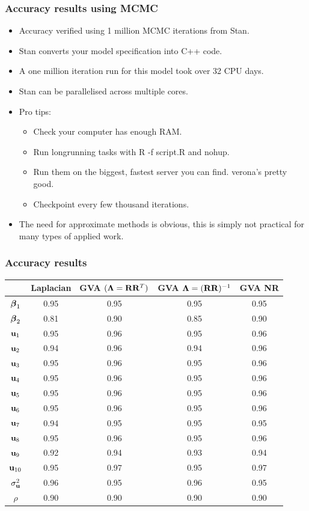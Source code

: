\documentclass{beamer}
\begin{document}
\begin{frame}
\frametitle{Accuracy results using MCMC}
\begin{itemize}
\item Accuracy verified using 1 million MCMC iterations from Stan.
\item Stan converts your model specification into C++ code.
\item A one million iteration run for this model took over 32 CPU days.
\item Stan can be parallelised across multiple cores.
\item Pro tips:
\begin{itemize}
\item Check your computer has enough RAM.
\item Run longrunning tasks with R -f script.R and nohup.
\item Run them on the biggest, fastest server you can find. verona's pretty good.
\item Checkpoint every few thousand iterations.
\end{itemize}
\item The need for approximate methods is obvious, this is simply not
practical for many types of applied work.
\end{itemize}
\end{frame}

\begin{frame}
\frametitle{Accuracy results}
\begin{tabular}{ccccc}
\hline
	& Laplacian & GVA $({\boldsymbol \Lambda}={\bf R} {\bf R}^T)$ & GVA ${\boldsymbol \Lambda}=({\bf R} {\bf R})^{-1}$ & GVA NR \\
\hline
${\boldsymbol \beta}_1$&0.95&0.95&0.95&0.95 \\
${\boldsymbol \beta}_2$&0.81&0.90&0.85&0.90 \\
${\bf u}_1$&0.95&0.96&0.95&0.96 \\
${\bf u}_2$&0.94&0.96&0.94&0.96 \\
${\bf u}_3$&0.95&0.96&0.95&0.96 \\
${\bf u}_4$&0.95&0.96&0.95&0.96 \\
${\bf u}_5$&0.95&0.96&0.95&0.96 \\
${\bf u}_6$&0.95&0.96&0.95&0.96 \\
${\bf u}_7$&0.94&0.95&0.95&0.95 \\
${\bf u}_8$&0.95&0.96&0.95&0.96 \\
${\bf u}_9$&0.92&0.94&0.93&0.94 \\
${\bf u}_{10}$&0.95&0.97&0.95&0.97 \\
$\sigma_{\bf u}^2$&0.96&0.95&0.96&0.95 \\
$\rho$&0.90&0.90&0.90&0.90 \\
\hline
\end{tabular}
\end{frame}
\end{document}
